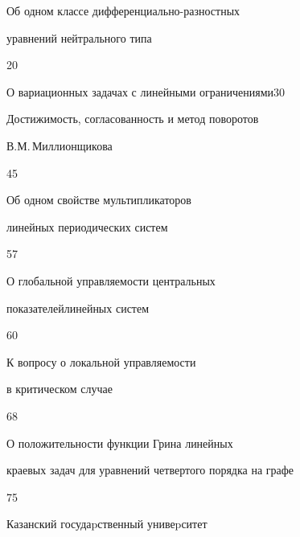 

{Об одном классе дифференциально-разностных


уравнений нейтрального типа}{20}




{О вариационных задачах с линейными ограничениями}{30}




{Достижимость, согласованность и метод поворотов\newline


В.М.\,Миллионщикова}{45}




{Об одном свойстве мультипликаторов


линейных периодических систем}{57}




{О глобальной управляемости центральных


показателей\newline линейных систем}{60}




{К вопросу о локальной управляемости


в критическом случае}{68}




{О положительности функции Грина линейных\newline


краевых задач для уравнений четвертого порядка на графе}{75}








\vfill


\noindent\raisebox{2pt}{\copyright} Казанский госудаpственный унивеpситет





